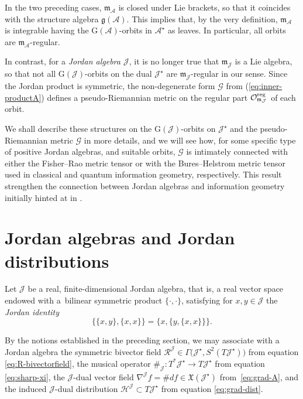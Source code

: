 \documentclass[10pt,a4paper]{amsart}
\numberwithin{equation}{section}
\newcommand{\hh}{\mathcal{H}}
\newcommand{\ocal}{\mathcal{O}}
\newcommand{\Jcal}{\mathcal{J}}
\newcommand{\m}{\mathfrak{m}}
\newcommand{\G}{\mathrm{G}}
\newcommand{\g}{{\mathfrak{g}}}
\renewcommand{\m}{{\mathfrak m}}
\newcommand{\cR}{\mathcal{R}}
\newcommand{\cA}{\mathcal{A}}
\newcommand{\Gcal}{\mathcal{G}}
\begin{document}
In the two preceding cases, $\m_\cA$ is closed under Lie brackets, so that it coincides with the structure algebra $\g(\cA)$.
This implies that, by the very definition, $\m_\cA$ is integrable having the $\G(\cA)$-orbits in $\cA^\star$ as leaves.
In particular, all orbits are $\m_\cA$-regular.

In contrast, for a {\em Jordan algebra $\Jcal$}, it is no longer true that $\m_\Jcal$ is a Lie algebra, so that not all $\G(\Jcal)$-orbits on the dual $\Jcal^\star$ are $\m_\Jcal$-regular in our sense.
Since the Jordan product is symmetric,
the non-degenerate form $\Gcal$ from (\ref{eq:inner-productA}) defines a pseudo-Riemannian metric on the regular part $\ocal^{\rm reg}_{\m_\Jcal}$ of each orbit.

We shall describe these structures on the $\G(\Jcal)$-orbits on $\Jcal^\star$ and the pseudo-Riemannian metric $\Gcal$ in more details, and we will see how, for some specific type of positive Jordan algebras, and suitable orbits, $\Gcal$ is intimately connected with either the Fisher--Rao metric tensor or with the Bures--Helstrom metric tensor used in classical and quantum information geometry, respectively.
This result strengthen the connection between Jordan algebras and information geometry initially hinted at in \cite{C-J-S-2020-02,C-J-S-2020}.

\section{Jordan algebras and Jordan distributions}\label{sec: Jordan algebras}

Let $\Jcal$ be a real, finite-dimensional Jordan algebra, that is, a real vector space endowed with a~bilinear symmetric product $\{\cdot,\cdot\}$, satisfying for $x,y\in\Jcal$ the {\em Jordan identity}
\[ %
\{\{x, y\}, \{x, x\}\} = \{x, \{y, \{x, x\}\}\}.
\]

By the notions established in the preceding section, we may associate with a Jordan algebra the symmetric bivector field $\cR^\Jcal \in \Gamma\big(\Jcal^\star, S^2(T\Jcal^\star)\big)$ from equation \eqref{eq:R-bivectorfield}, the musical operator $\#_\Jcal\colon T^\ast \Jcal^\star \to T\Jcal^\star$ from equation \eqref{eq:sharp-xi}, the $\Jcal$-dual vector field $\nabla^\Jcal f = \#df \in \mathfrak{X}(\Jcal^\star)$ from~\eqref{eq:grad-A}, and the induced $\Jcal$-dual distribution $\hh^\Jcal \subset T\Jcal^\star$ from equation \eqref{eq:grad-dist}.
\end{document}
